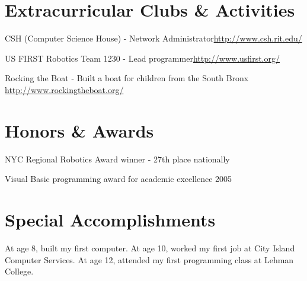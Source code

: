 \documentclass[a4paper,margin,line]{resume}
\newcommand{\rurl}[1]{\hfill {\footnotesize \url{#1}}}
\begin{document}
\begin{resume}
\section{\mysidestyle Extracurricular Clubs \& Activities}
	\begin{asparablank}
		\item CSH ({\small Computer Science House}) - Network Administrator\rurl{http://www.csh.rit.edu/}
		\item US FIRST Robotics Team 1230 - {\small Lead programmer}\rurl{http://www.usfirst.org/}
		\item Rocking the Boat - {\small Built a boat for children from the South Bronx} \rurl{http://www.rockingtheboat.org/}
	\end{asparablank}

\section{\mysidestyle Honors \& Awards}
	\begin{asparablank}
		\item NYC Regional Robotics Award winner - {\small 27th place nationally}
		\item Visual Basic programming award for academic excellence 2005
	\end{asparablank}

\section{\mysidestyle Special Accomplishments}
	\begin{asparablank}
		\item At age 8, built my first computer. At age 10, worked my first job at City Island Computer Services. At age 12, attended my first programming class at Lehman College.
	\end{asparablank}

\end{resume}
\end{document}
